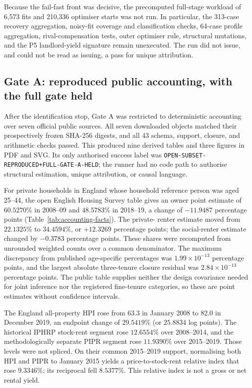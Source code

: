 Because the fail-fast front was decisive, the precomputed full-stage workload
of 6,573 fits and 210,336 optimiser starts was not run.  In particular, the
313-case recovery aggregation, noisy-fit coverage and classification checks,
64-case profile aggregation, rival-compensation tests, outer optimiser rule,
structural mutations, and the P5 landlord-yield signature remain unexecuted.
The run did not issue, and could not be read as issuing, a pass for unique
attribution.

\subsection{Gate A: reproduced public accounting, with the full gate held}
\label{sec:gatea-results}

After the identification stop, Gate A was restricted to deterministic
accounting over seven official public sources.  All seven downloaded objects
matched their prospectively frozen SHA-256 digests, and all 43 schema, support,
closure, and arithmetic checks passed.  This produced nine derived tables and
three figures in PDF and SVG.  Its only authorised success label was
\texttt{OPEN-SUBSET-REPRODUCED+FULL-GATE-A-HELD}; the runner had no code path
to authorise structural estimation, unique attribution, or causal language.

For private households in England whose household reference person was aged
25--44, the open English Housing Survey table gives an owner point estimate of
$60.5270\%$ in 2008--09 and $48.5783\%$ in 2018--19, a change of
$-11.9487$ percentage points (Table~\ref{tab:accounting-facts}).  The private-
renter estimate moved from $22.1325\%$ to $34.4594\%$, or $+12.3269$
percentage points; the social-renter estimate changed by $-0.3783$ percentage
points.  These shares were recomputed from unrounded weighted counts over a
common denominator.  The maximum discrepancy from published age-specific
percentages was $1.99\times10^{-13}$ percentage points, and the largest
absolute three-tenure closure residual was $2.84\times10^{-13}$ percentage
points.  The public table supplies neither the design covariance needed for
joint inference nor the registered fine-tenure categories, so these are point
estimates without confidence intervals.

The England all-property HPI rose from 63.3 in January 2008 to 82.0 in
December 2019, an endpoint change of $29.5419\%$ (or $25.8834$ log points).
The historical IPHRP stock-rent segment rose $12.6554\%$ over 2008--2014, and
the methodologically separate PIPR segment rose $11.9390\%$ over 2015--2019.
Those levels were not spliced.  On their common 2015--2019 support, normalising
both HPI and PIPR to January 2015 yields a price-to-stock-rent relative index
that rose $9.3346\%$; its reciprocal fell $8.5377\%$.  This relative index is
not a gross or net rental yield.

